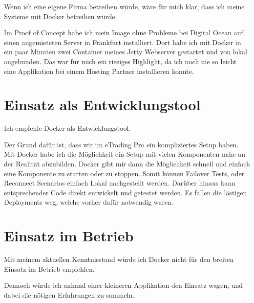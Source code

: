 Wenn ich eine eigene Firma betreiben würde, wäre für mich klar, dass ich meine Systeme mit Docker
betreiben würde.

Im Proof of Concept habe ich mein Image ohne Probleme bei Digital Ocean auf einen angemieteten Server
in Frankfurt installiert. Dort habe ich mit Docker in ein paar Minuten zwei Container meines
Jetty Webserver gestartet und von lokal angebunden. Das war für mich ein riesiges Highlight, da ich
noch nie so leicht eine Applikation bei einem Hosting Partner installieren konnte.

\section{Einsatz als Entwicklungstool}

Ich empfehle Docker als Entwicklungstool.

Der Grund dafür ist, dass wir im eTrading Pro ein
kompliziertes Setup haben. Mit Docker habe ich die Möglichkeit ein Setup mit vielen Komponenten
nahe an der Realität abzubilden. Docker gibt mir dann die Möglichkeit schnell und einfach eine
Komponente zu starten oder zu stoppen. Somit können Failover Tests, oder Reconnect Scenarios einfach
Lokal nachgestellt werden. Darüber hinaus kann entsprechender Code direkt entwickelt und getestet
werden. Es fallen die lästigen Deployments weg, welche vorher dafür notwendig waren.

\section{Einsatz im Betrieb}

Mit meinem aktuellen Kenntnisstand würde ich Docker nicht für den breiten Einsatz im Betrieb empfehlen.

Dennoch würde ich anhand einer kleineren Applikation den Einsatz wagen, und dabei die nötigen
Erfahrungen zu sammeln.